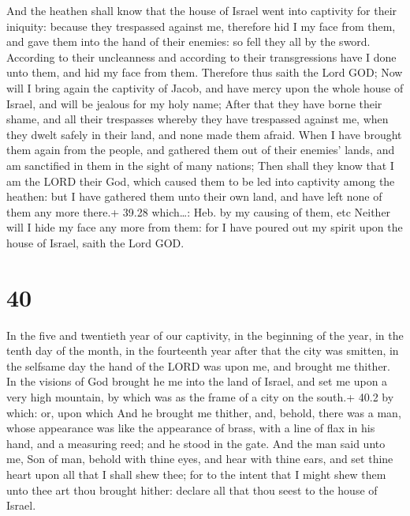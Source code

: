  And the heathen shall know that the house of Israel went
into captivity for their iniquity: because they trespassed against me,
therefore hid I my face from them, and gave them into the hand of their
enemies: so fell they all by the sword.  According to their
uncleanness and according to their transgressions have I done unto them,
and hid my face from them.  Therefore thus saith the Lord
GOD; Now will I bring again the captivity of Jacob, and have mercy upon
the whole house of Israel, and will be jealous for my holy name;
 After that they have borne their shame, and all their
trespasses whereby they have trespassed against me, when they dwelt
safely in their land, and none made them afraid.  When I
have brought them again from the people, and gathered them out of their
enemies' lands, and am sanctified in them in the sight of many nations;
 Then shall they know that I am the LORD their God, which
caused them to be led into captivity among the heathen: but I have
gathered them unto their own land, and have left none of them any more
there.+ 39.28 which\ldots: Heb. by my causing of them, etc 
Neither will I hide my face any more from them: for I have poured out my
spirit upon the house of Israel, saith the Lord GOD.

\hypertarget{section-39}{%
\section{40}\label{section-39}}

 In the five and twentieth year of our captivity, in the
beginning of the year, in the tenth day of the month, in the fourteenth
year after that the city was smitten, in the selfsame day the hand of
the LORD was upon me, and brought me thither.  In the
visions of God brought he me into the land of Israel, and set me upon a
very high mountain, by which was as the frame of a city on the south.+
40.2 by which: or, upon which  And he brought me thither,
and, behold, there was a man, whose appearance was like the appearance
of brass, with a line of flax in his hand, and a measuring reed; and he
stood in the gate.  And the man said unto me, Son of man,
behold with thine eyes, and hear with thine ears, and set thine heart
upon all that I shall shew thee; for to the intent that I might shew
them unto thee art thou brought hither: declare all that thou seest to
the house of Israel.

